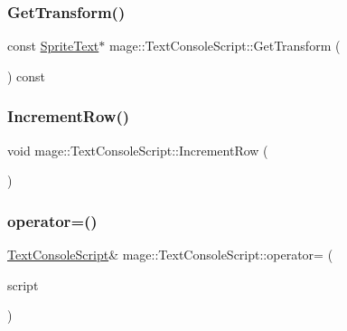 \subsubsection{\texorpdfstring{Get\+Transform()}{GetTransform()}\hspace{0.1cm}{\footnotesize\ttfamily [2/2]}}
{\footnotesize\ttfamily const \hyperlink{classmage_1_1_sprite_text}{Sprite\+Text}$\ast$ mage\+::\+Text\+Console\+Script\+::\+Get\+Transform (\begin{DoxyParamCaption}{ }\end{DoxyParamCaption}) const}

\hypertarget{classmage_1_1_text_console_script_a0e82c5d5b84499bf4ed2233cf26145fa}{}\label{classmage_1_1_text_console_script_a0e82c5d5b84499bf4ed2233cf26145fa} 
\subsubsection{\texorpdfstring{Increment\+Row()}{IncrementRow()}}
{\footnotesize\ttfamily void mage\+::\+Text\+Console\+Script\+::\+Increment\+Row (\begin{DoxyParamCaption}{ }\end{DoxyParamCaption})\hspace{0.3cm}{\ttfamily [private]}}

\hypertarget{classmage_1_1_text_console_script_af7da3f0735f72fed0d6fc265b6ae07e9}{}\label{classmage_1_1_text_console_script_af7da3f0735f72fed0d6fc265b6ae07e9} 
\subsubsection{\texorpdfstring{operator=()}{operator=()}\hspace{0.1cm}{\footnotesize\ttfamily [1/2]}}
{\footnotesize\ttfamily \hyperlink{classmage_1_1_text_console_script}{Text\+Console\+Script}\& mage\+::\+Text\+Console\+Script\+::operator= (\begin{DoxyParamCaption}\item[{const \hyperlink{classmage_1_1_text_console_script}{Text\+Console\+Script} \&}]{script }\end{DoxyParamCaption})\hspace{0.3cm}{\ttfamily [delete]}}

